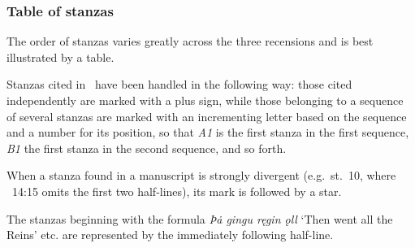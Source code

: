 \subsubsection{Table of stanzas}

The order of stanzas varies greatly across the three recensions and is best illustrated by a table.

Stanzas cited in \Gylfaginning\ have been handled in the following way: those cited independently are marked with a plus sign, while those belonging to a sequence of several stanzas are marked with an incrementing letter based on the sequence and a number for its position, so that \emph{A1} is the first stanza in the first sequence, \emph{B1} the first stanza in the second sequence, and so forth.

When a stanza found in a manuscript is strongly divergent (e.g.~st.~10, where \Gylfaginning~14:15 omits the first two half-lines), its mark is followed by a star.

The stanzas beginning with the formula \emph{Þȧ gingu ręgin ǫll} ‘Then went all the Reins’ etc. are represented by the immediately following half-line.

